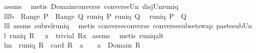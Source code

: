 \begin{isabellebody}
%
\isadelimproof
%
\endisadelimproof
%
\isatagproof
{}\isamarkupfalse%
\ assms\ \isamarkupfalse%
\ {\isacharparenleft}metis\ Domain{\isacharunderscore}converse\ converse{\isacharunderscore}Un\ disj{\isacharunderscore}Un{\isacharunderscore}runiq{\isacharparenright}%
\endisatagproof
{\isafoldproof}%
%
\isadelimproof
\isanewline
%
\endisadelimproof
\isanewline
{}\isamarkupfalse%
\ lll{}{}b{\isacharcolon}\ \ {\isachardoublequoteopen}Range\ P\ {\isasyminter}\ {\isacharparenleft}Range\ Q{\isacharparenright}{\isacharequal}{\isacharbraceleft}{\isacharbraceright}{\isachardoublequoteclose}\ {\isachardoublequoteopen}runiq\ {\isacharparenleft}P{\isacharcircum}{\isacharminus}{}{\isacharparenright}{\isachardoublequoteclose}\ {\isachardoublequoteopen}runiq\ {\isacharparenleft}Q{\isacharcircum}{\isacharminus}{}{\isacharparenright}{\isachardoublequoteclose}\ \isanewline
{}\ {\isachardoublequoteopen}runiq\ {\isacharparenleft}{\isacharparenleft}P\ {\isacharplus}{\isacharasterisk}\ Q{\isacharparenright}{\isacharcircum}{\isacharminus}{}{\isacharparenright}{\isachardoublequoteclose}\isanewline
%
\isadelimproof
%
\endisadelimproof
%
\isatagproof
{}\isamarkupfalse%
\ lll{}{}\ assms\ subrel{\isacharunderscore}runiq\ \isamarkupfalse%
\ {\isacharparenleft}metis\ converse{\isacharunderscore}converse\ converse{\isacharunderscore}subset{\isacharunderscore}swap\ paste{\isacharunderscore}sub{\isacharunderscore}Un{\isacharparenright}%
\endisatagproof
{\isafoldproof}%
%
\isadelimproof
\isanewline
%
\endisadelimproof
\isanewline
{}\isamarkupfalse%
\ l{}{}{\isacharcolon}\ {\isachardoublequoteopen}runiq\ R\ {\isacharequal}\ {\isacharparenleft}{\isasymforall}\ x\ {\isachardot}\ trivial\ {\isacharparenleft}R{\isacharbackquote}{\isacharbackquote}{\isacharbraceleft}x{\isacharbraceright}{\isacharparenright}{\isacharparenright}{\isachardoublequoteclose}\isanewline
%
\isadelimproof
%
\endisadelimproof
%
\isatagproof
{}\isamarkupfalse%
\ assms\ \isamarkupfalse%
\ {\isacharparenleft}metis\ runiq{\isacharunderscore}alt{\isacharparenright}%
\endisatagproof
{\isafoldproof}%
%
\isadelimproof
%
\endisadelimproof
\ \isanewline
\isanewline
\isanewline
{}\isamarkupfalse%
\ lm{}{}{}{\isacharcolon}\ \ {\isachardoublequoteopen}runiq\ R{\isachardoublequoteclose}\ \ {\isachardoublequoteopen}card\ {\isacharparenleft}R\ {\isacharbackquote}{\isacharbackquote}\ {\isacharbraceleft}a{\isacharbraceright}{\isacharparenright}\ {\isacharequal}\ {}\ {\isasymlongleftrightarrow}\ a\ {\isasymin}\ Domain\ R{\isachardoublequoteclose}\isanewline

\end{isabellebody}
